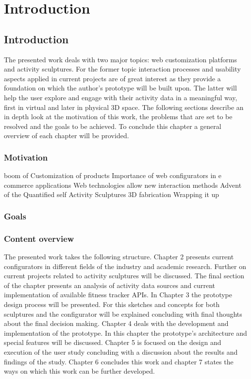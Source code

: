 \chapter{Introduction}
\label{ch:intro}

\section{Introduction}
The presented work deals with two major topics: web customization platforms and
activity sculptures. For the former topic interaction processes and usability aspects
applied in current projects are of great interest as they provide a foundation on
which the author's prototype will be built upon. The latter will help the user
explore and engage with their activity data in a meaningful way, first in virtual and later in
physical 3D space. The following sections describe an in depth look at the
motivation of this work, the problems that are set to be resolved and the goals
to be achieved. To conclude this chapter a general overview of each chapter will be
provided. 

\subsection{Motivation}
boom of Customization of products 
Importance of web configurators in e commerce applications
Web technologies allow new interaction methods
Advent of the Quantified self
Activity Sculptures 
3D fabrication
Wrapping it up


\subsection{Goals}
\subsection{Content overview}
The presented work takes the following structure. Chapter 2 presents current
configurators in different fields of the industry and academic research. Further
on current projects related to activity sculptures will be discussed. The final
section of the chapter presents an analysis of activity data sources
and current implementation of available fitness tracker APIs. In Chapter 3 the
prototype design process will be presented. For this sketches and concepts for
both sculptures and the configurator will be explained concluding with final
thoughts about the final decision making. Chapter 4 deals with the development
and implementation of the prototype. In this chapter the prototype's architecture and
special features will be discussed. Chapter 5 is focused on the design and
execution of the user study concluding with a discussion about the results and
findings of the study. Chapter 6 concludes this work and chapter 7 states the
ways on which this work can be further developed.
